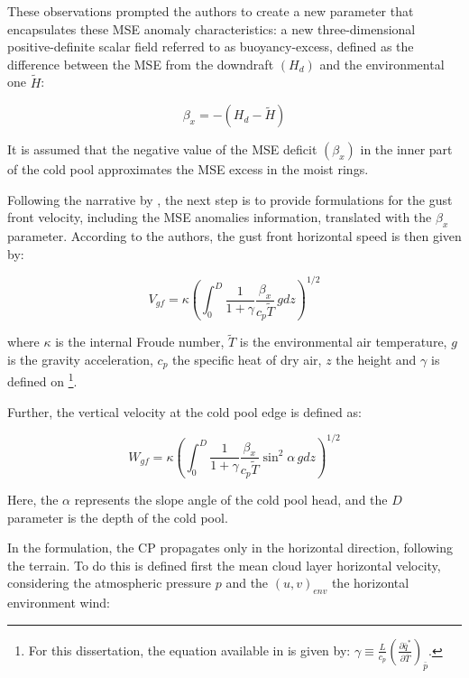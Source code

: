 These observations prompted the authors to create a new parameter that encapsulates these MSE anomaly characteristics: a new three-dimensional positive-definite scalar field referred to as buoyancy-excess, defined as the difference between the MSE from the downdraft $(H_d)$ and the environmental one $\tilde H$:

\begin{equation}
	\beta_x = -(H_d-\tilde H)
\end{equation}

It is assumed that the negative value of the MSE deficit $(\beta_x)$ in the inner part of the cold pool approximates the MSE excess in the moist rings.

Following the narrative by , the next step is to provide formulations for the gust front velocity, including the MSE anomalies information, translated with the $\beta_x$ parameter. According to the authors, the gust front horizontal speed is then given by:

\begin{equation}
	V_{gf}=\kappa \left( \int_{0}^{D} \frac{1}{1+\gamma } \frac{\beta _x}{c_p \widetilde{T}}\, gdz\right)^{1/2}
	\label{eq:equation1}
\end{equation}

where $\kappa$ is the internal Froude number, $\widetilde{T}$ is the environmental air temperature, $g$ is the gravity acceleration, $c_p$ the specific heat of dry air, $z$ the height and $\gamma$ is defined on \footnote{For this dissertation, the equation available in  is given by: 
	\newline
	$\gamma \equiv \frac{L}{c_p} \left( \frac{\partial \bar{q}^*}{\partial \bar{T}} \right)_{\bar{p}}
	$.}.

Further, the vertical velocity at the cold pool edge is defined as:

\begin{equation}
	W_{gf}=\kappa \left( \int_{0}^{D} \frac{1}{1+\gamma } \frac{\beta _x}{c_p \widetilde{T}}\sin^2 \alpha \, gdz\right)^{1/2}
\end{equation}

Here, the $\alpha$ represents the slope angle of the cold pool head, and the $D$ parameter is the depth of the cold pool.

In the  formulation, the CP propagates only in the horizontal direction, following the terrain. To do this is defined first the mean cloud layer horizontal velocity, considering the atmospheric pressure $p$ and the $(u,v)_{env}$ the horizontal environment wind:

